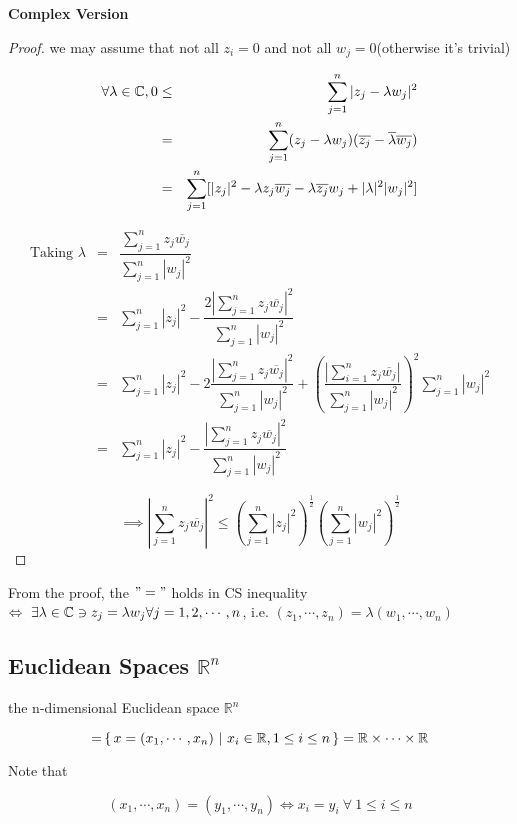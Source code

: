 \textbf{Complex Version}

\begin{proof}
	we may assume that not all $z_i = 0$ and not all $w_j = 0$(otherwise it's trivial)
	
	\begin{eqnarray*}
		\forall \lambda \in \mathbb{C}, 0 &\leq& \sum_{j = 1}^n|z_j - \lambda w_j|^2\\
		&=& \sum^n_{j=1}(z_j - \lambda w_j)(\overline{z_j} - \overline{\lambda}\overline{w_j} )\\
		&=& \sum^n_{j=1}[|z_j|^2 - \lambda z_j \overline{w_j} - \lambda \overline{z_j}w_j + |\lambda|^2|w_j|^2]
	\end{eqnarray*}
	
	\begin{eqnarray*}
		\text{Taking } \lambda &=& \dfrac{\sum^n_{j=1}z_j\overline{w_j}}{\sum^{n}_{j=1}|w_j|^2}\\
		&=& \sum^n_{j=1} |z_j|^2 - \dfrac{2 |\sum^n_{j=1}z_j\overline{w_j}|^2}{\sum^n_{j=1}|w_j|^2}\\
		&=& \sum^n_{j=1} |z_j|^2 - 2 \dfrac{|\sum^n_{j=1}z_j\overline{w_j}|^2}{\sum^n_{j=1}|w_j|^2} + \left( \dfrac{|\sum^n_{i=1}z_j\overline{w_j}|}{\sum^n_{j=1}|w_j|^2}\right)^2\sum^n_{j=1}|w_j|^2\\
		&=& \sum^n_{j=1}|z_j|^2 - \dfrac{|\sum^n_{j=1}z_j\overline{w_j}|^2}{\sum^n_{j=1}|w_j|^2}
	\end{eqnarray*}
	
	$$\implies |\sum^n_{j=1}z_j\overline{w_j}|^2 \leq (\sum^n_{j=1}|z_j|^2)^{\frac{1}{2}}(\sum^n_{j=1}|w_j|^2)^{\frac{1}{2}}$$
\end{proof}

\begin{rmk*}
	From the proof, the $"="$ holds in CS inequality $\Leftrightarrow ~ \exists \lambda \in \mathbb{C} \ni z_j = \lambda w_j \forall j = 1,2,\cdots,n$, i.e. $(z_1,\cdots,z_n) = \lambda (w_1,\cdots,w_n)$
\end{rmk*}




\subsection{Euclidean Spaces $\mathbb R^n$}

\begin{defn}
	the n-dimensional Euclidean space $\mathbb R^n$
	
	$$\mathbb = \left\{ \,x = (x_1,\cdots,x_n)~|~x_i \in \mathbb R, 1\leq i \leq n \,\right\} = \mathbb R \times \cdots \times \mathbb R$$
	
	Note that
	
	$$(x_1,\cdots,x_n) = (y_1,\cdots,y_n) \Leftrightarrow x_i=y_i ~\forall~1\leq i \leq n$$
\end{defn}

